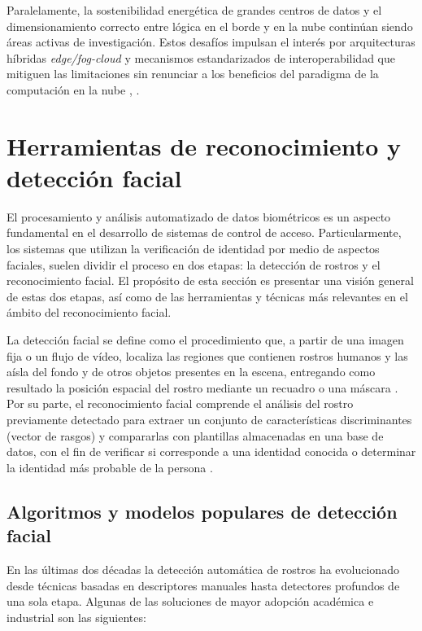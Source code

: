 Paralelamente, la sostenibilidad energética de grandes centros de datos y el dimensionamiento correcto entre lógica en el borde y en la nube continúan siendo áreas activas de investigación.  Estos desafíos impulsan el interés por arquitecturas híbridas \emph{edge/fog-cloud} y mecanismos estandarizados de interoperabilidad que mitiguen las limitaciones sin renunciar a los beneficios del paradigma de la computación en la nube \cite{shehabi_2024}, \cite{fernando_2025}.

\section{Herramientas de reconocimiento y detección facial}

El procesamiento y análisis automatizado de datos biométricos es un aspecto fundamental en el desarrollo de sistemas de control de acceso. Particularmente, los sistemas que utilizan la verificación de identidad por medio de aspectos faciales, suelen dividir el proceso en dos etapas: la detección de rostros y el reconocimiento facial. El propósito de esta sección es presentar una visión general de estas dos etapas, así como de las herramientas y técnicas más relevantes en el ámbito del reconocimiento facial.

La detección facial se define como el procedimiento que, a partir de una imagen fija o un flujo de vídeo, localiza las regiones que contienen rostros humanos y las aísla del fondo y de otros objetos presentes en la escena, entregando como resultado la posición espacial del rostro mediante un recuadro o una máscara \cite{li_jain_2011}. Por su parte, el reconocimiento facial comprende el análisis del rostro previamente detectado para extraer un conjunto de características discriminantes (vector de rasgos) y compararlas con plantillas almacenadas en una base de datos, con el fin de verificar si corresponde a una identidad conocida o determinar la identidad más probable de la persona \cite{li_jain_2011}.

\subsection{Algoritmos y modelos populares de detección facial}

En las últimas dos décadas la detección automática de rostros ha evolucionado desde técnicas basadas en descriptores manuales hasta detectores profundos de una sola etapa. Algunas de las soluciones de mayor adopción académica e industrial son las siguientes:

